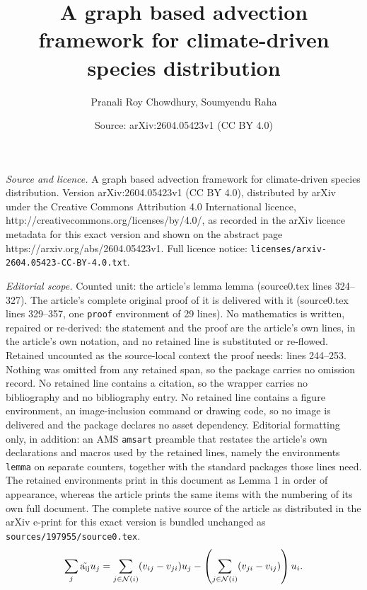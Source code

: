 \documentclass[10pt,a4paper]{amsart}
\title{A graph based advection framework for climate-driven species distribution}
\author{Pranali Roy Chowdhury, Soumyendu Raha}
\date{Source: arXiv:2604.05423v1 (CC BY 4.0)}
\begin{document}
\maketitle

\noindent\emph{Source and licence.} A graph based advection framework for climate-driven species distribution. Version arXiv:2604.05423v1 (CC BY 4.0), distributed by arXiv under the Creative Commons Attribution 4.0 International licence, http://creativecommons.org/licenses/by/4.0/, as recorded in the arXiv licence metadata for this exact version and shown on the abstract page https://arxiv.org/abs/2604.05423v1. Full licence notice: \texttt{licenses/arxiv-2604.05423-CC-BY-4.0.txt}.\par\smallskip

\noindent\textit{Editorial scope.} Counted unit: the article's lemma lemma (source0.tex lines 324--327). The article's complete original proof of it is delivered with it (source0.tex lines 329--357, one \texttt{proof} environment of 29 lines). No mathematics is written, repaired or re-derived: the statement and the proof are the article's own lines, in the article's own notation, and no retained line is substituted or re-flowed.  Retained uncounted as the source-local context the proof needs: lines 244--253.  Nothing was omitted from any retained span, so the package carries no omission record.  No retained line contains a citation, so the wrapper carries no bibliography and no bibliography entry.  No retained line contains a figure environment, an image-inclusion command or drawing code, so no image is delivered and the package declares no asset dependency.  Editorial formatting only, in addition: an AMS \texttt{amsart} preamble that restates the article's own declarations and macros used by the retained lines, namely the environments \texttt{lemma} on separate counters, together with the standard packages those lines need.  The retained environments print in this document as Lemma 1 in order of appearance, whereas the article prints the same items with the numbering of its own full document.  The complete native source of the article as distributed in the arXiv e-print for this exact version is bundled unchanged as \texttt{sources/197955/source0.tex}.
\begin{equation}\label{eq:_Disc_Advection_operator}
\sum_j \mathrm{\Tilde{a_{ij}}}u_j
=
\sum_{j \in \mathcal{N}(i)} (v_{ij} - v_{ji}) u_j
-
\left(
\sum_{j \in \mathcal{N}(i)} (v_{ji} - v_{ij})
\right)
u_i.
\end{equation}
\end{document}
